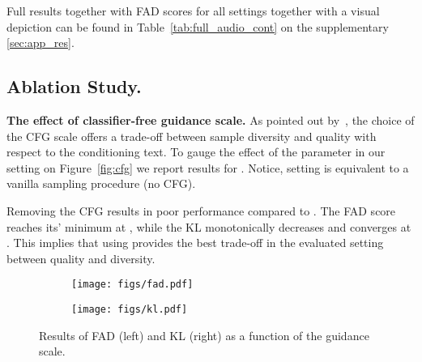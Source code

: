 Full results together with FAD scores for all settings together with a visual depiction can be found in Table~\ref{tab:full_audio_cont} on the supplementary \ref{sec:app_res}.



\subsection{Ablation Study.}
\label{sec:abl}

{\noindent \bf{The effect of classifier-free guidance scale.}} As pointed out by~\citet{ho2021classifier}, the choice of the \ac{CFG} scale offers a trade-off between sample diversity and quality with respect to the conditioning text. To gauge the effect of the  parameter in our setting on Figure~\ref{fig:cfg} we report results for . Notice, setting  is equivalent to a vanilla sampling procedure (no \ac{CFG}).


Removing the \ac{CFG} results in poor performance compared to . The FAD score reaches its' minimum at , while the KL monotonically decreases and converges at . This implies that using  provides the best trade-off in the evaluated setting between quality and diversity.



\begin{figure}
\centering
\begin{subfigure}{0.45\textwidth}
    \centering
    \texttt{[image: figs/fad.pdf]}
    \label{fig:first}
\end{subfigure}
\begin{subfigure}{0.46\textwidth}
    \centering
    \texttt{[image: figs/kl.pdf]}
    \label{fig:second}
\end{subfigure}
\caption{\label{fig:cfg} Results of FAD (left) and KL (right) as a function of the guidance scale.}
\label{fig:figures}
\end{figure}


